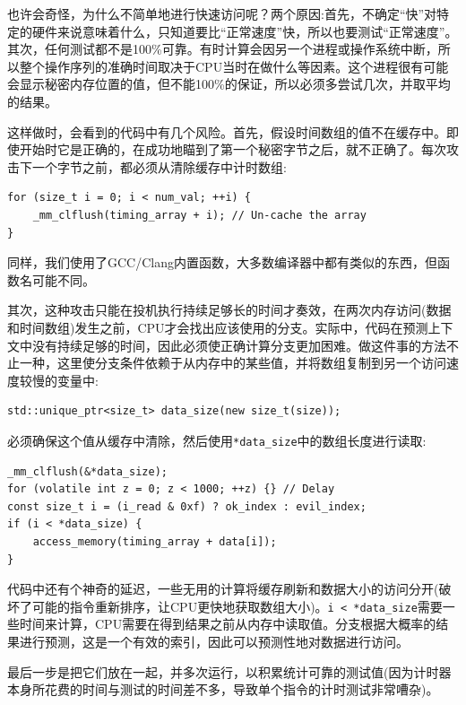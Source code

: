 也许会奇怪，为什么不简单地进行快速访问呢？两个原因:首先，不确定“快”对特定的硬件来说意味着什么，只知道要比“正常速度”快，所以也要测试“正常速度”。其次，任何测试都不是100\%可靠。有时计算会因另一个进程或操作系统中断，所以整个操作序列的准确时间取决于CPU当时在做什么等因素。这个进程很有可能会显示秘密内存位置的值，但不能100\%的保证，所以必须多尝试几次，并取平均的结果。

这样做时，会看到的代码中有几个风险。首先，假设时间数组的值不在缓存中。即使开始时它是正确的，在成功地瞄到了第一个秘密字节之后，就不正确了。每次攻击下一个字节之前，都必须从清除缓存中计时数组:

\begin{lstlisting}[style=styleCXX]
for (size_t i = 0; i < num_val; ++i) {
	_mm_clflush(timing_array + i); // Un-cache the array
}
\end{lstlisting}

同样，我们使用了GCC/Clang内置函数，大多数编译器中都有类似的东西，但函数名可能不同。

其次，这种攻击只能在投机执行持续足够长的时间才奏效，在两次内存访问(数据和时间数组)发生之前，CPU才会找出应该使用的分支。实际中，代码在预测上下文中没有持续足够的时间，因此必须使正确计算分支更加困难。做这件事的方法不止一种，这里使分支条件依赖于从内存中的某些值，并将数组复制到另一个访问速度较慢的变量中:

\begin{lstlisting}[style=styleCXX]
std::unique_ptr<size_t> data_size(new size_t(size));
\end{lstlisting}

必须确保这个值从缓存中清除，然后使用\texttt{*data\_size}中的数组长度进行读取:

\begin{lstlisting}[style=styleCXX]
_mm_clflush(&*data_size);
for (volatile int z = 0; z < 1000; ++z) {} // Delay
const size_t i = (i_read & 0xf) ? ok_index : evil_index;
if (i < *data_size) {
	access_memory(timing_array + data[i]);
}
\end{lstlisting}

代码中还有个神奇的延迟，一些无用的计算将缓存刷新和数据大小的访问分开(破坏了可能的指令重新排序，让CPU更快地获取数组大小)。\texttt{i < *data\_size}需要一些时间来计算，CPU需要在得到结果之前从内存中读取值。分支根据大概率的结果进行预测，这是一个有效的索引，因此可以预测性地对数据进行访问。


最后一步是把它们放在一起，并多次运行，以积累统计可靠的测试值(因为计时器本身所花费的时间与测试的时间差不多，导致单个指令的计时测试非常嘈杂)。

